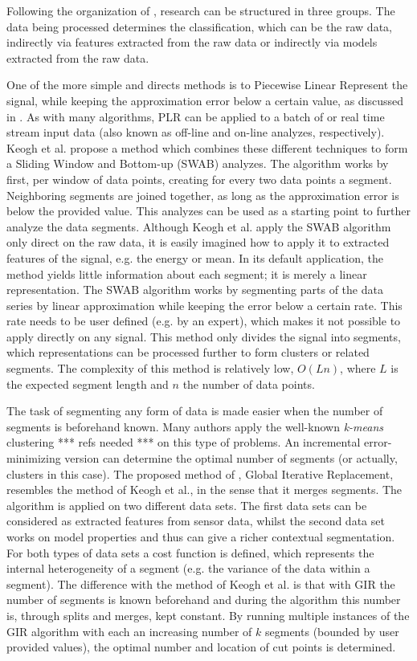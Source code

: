 Following the organization of \cite{warren2005clustering}, research can be structured in three groups.
The data being processed determines the classification, which can be the raw data, indirectly via features extracted from the raw data or indirectly via models extracted from the raw data.

One of the more simple and directs methods is to Piecewise Linear Represent the signal, while keeping the approximation error below a certain value, as discussed in \cite{keogh2001online}.
As with many algorithms, PLR can be applied to a batch of or real time stream input data (also known as off-line and on-line analyzes, respectively).
Keogh et al. \cite{keogh2001online} propose a method which combines these different techniques to form a Sliding Window and Bottom-up (SWAB) analyzes.
The algorithm works by first, per window of data points, creating for every two data points a segment.
Neighboring segments are joined together, as long as the approximation error is below the provided value.
This analyzes can be used as a starting point to further analyze the data segments.
Although Keogh et al. apply the SWAB algorithm only direct on the raw data, it is easily imagined how to apply it to extracted features of the signal, e.g. the energy or mean.
In its default application, the method yields little information about each segment; it is merely a linear representation.
The SWAB algorithm works by segmenting parts of the data series by linear approximation while keeping the error below a certain rate.
This rate needs to be user defined (e.g. by an expert), which makes it not possible to apply directly on any signal.
This method only divides the signal into segments, which representations can be processed further to form clusters or related segments.
The complexity of this method is relatively low, $O(Ln)$, where $L$ is the expected segment length and $n$ the number of data points.

The task of segmenting any form of data is made easier when the number of segments is beforehand known.
Many authors apply the well-known \emph{k-means} clustering *** refs needed *** on this type of problems.
An incremental error-minimizing version can determine the optimal number of segments (or actually, clusters in this case).
The proposed method of \cite{himberg2001time}, Global Iterative Replacement, resembles the method of Keogh et al., in the sense that it merges segments.
The algorithm is applied on two different data sets.
The first data sets can be considered as extracted features from sensor data, whilst the second data set works on model properties and thus can give a richer contextual segmentation.
For both types of data sets a cost function is defined, which represents the internal heterogeneity of a segment (e.g. the variance of the data within a segment).
The difference with the method of Keogh et al. is that with GIR the number of segments is known beforehand and during the algorithm this number is, through splits and merges, kept constant.
By running multiple instances of the GIR algorithm with each an increasing number of $k$ segments (bounded by user provided values), the optimal number and location of cut points is determined.

